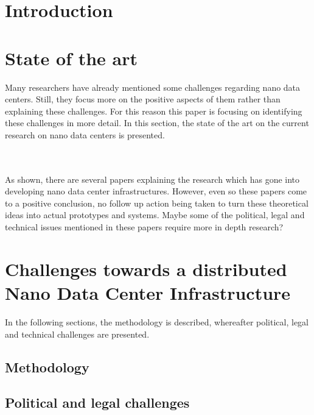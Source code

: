 
\section{Introduction}


\section{State of the art}
\label{StateOfTheArt}
Many researchers have already mentioned some challenges regarding nano data centers. Still, they focus more on the positive aspects of them rather than explaining these challenges. For this reason this paper is focusing on identifying these challenges in more detail. In this section, the state of the art on the current research on nano data centers is presented. 



\\ \\
As shown, there are several papers explaining the research which has gone into developing nano data center infrastructures. However, even so these papers come to a positive conclusion, no follow up action being taken to turn these theoretical ideas into actual prototypes and systems. Maybe some of the political, legal and technical issues mentioned in these papers require more in depth research?

\section{Challenges towards a distributed Nano Data Center Infrastructure}
\label{sec:challenges}
In the following sections, the methodology is described, whereafter political, legal and technical challenges are presented.

\subsection{Methodology}



\subsection{Political and legal challenges}



